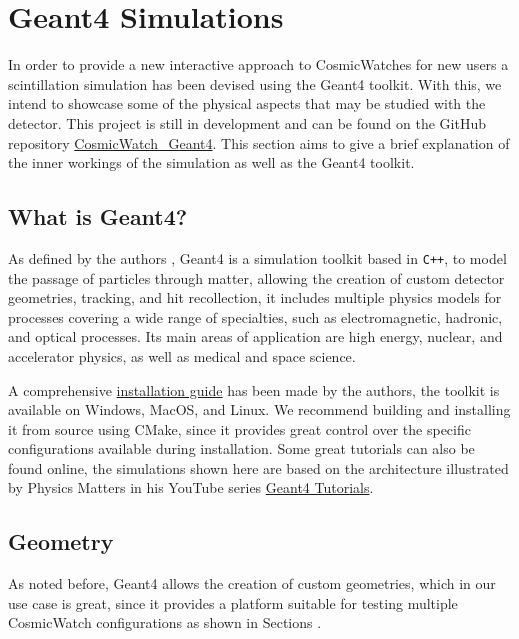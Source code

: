 \chapter{Geant4 Simulations}

In order to provide a new interactive approach to CosmicWatches for new users a scintillation simulation has been devised using the Geant4 toolkit. With this, we intend to showcase some of the physical aspects that may be studied with the detector. This project is still in development and can be found on the GitHub repository \href{https://github.com/spenceraxani/CosmicWatch_Geant4}{CosmicWatch\_Geant4}. This section aims to give a brief explanation of the inner workings of the simulation as well as the Geant4 toolkit.

\section{What is Geant4?}

As defined by the authors \cite{Geant4}, Geant4 is a simulation toolkit based in \texttt{C++}, to model the passage of particles through matter, allowing the creation of custom detector geometries, tracking, and hit recollection, it includes multiple physics models for processes covering a wide range of specialties, such as electromagnetic, hadronic, and optical processes. Its main areas of application are high energy, nuclear, and accelerator physics, as well as medical and space science.

A comprehensive \href{https://geant4-userdoc.web.cern.ch/UsersGuides/InstallationGuide/html/}{installation guide} has been made by the authors, the toolkit is available on Windows, MacOS, and Linux. We recommend building and installing it from source using CMake, since it provides great control over the specific configurations available during installation. Some great tutorials can also be found online, the simulations shown here are based on the architecture illustrated by Physics Matters in his YouTube series \href{https://youtube.com/playlist?list=PLLybgCU6QCGWgzNYOV0SKen9vqg4KXeVL&si=mdzOyTZS0DYsf_vc}{Geant4 Tutorials}.

\section{Geometry}

As noted before, Geant4 allows the creation of custom geometries, which in our use case is great, since it provides a platform suitable for testing multiple CosmicWatch configurations as shown in Sections .

